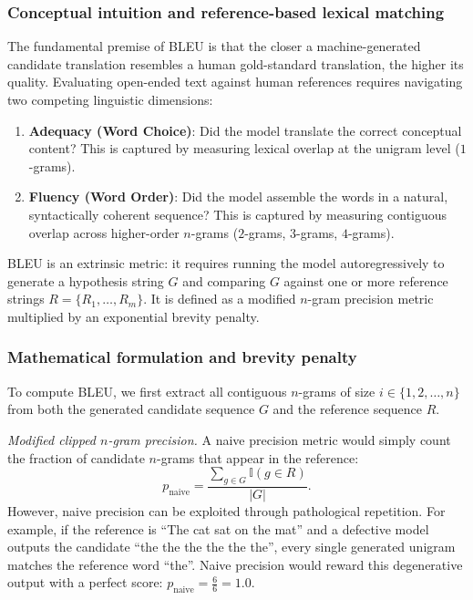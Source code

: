 \documentclass[../../main.tex]{subfiles}
\begin{document}
\subsubsection{Conceptual intuition and reference-based lexical matching}
The fundamental premise of BLEU is that the closer a machine-generated candidate translation resembles a human gold-standard translation, the higher its quality. Evaluating open-ended text against human references requires navigating two competing linguistic dimensions:
\begin{enumerate}
    \item \textbf{Adequacy (Word Choice)}: Did the model translate the correct conceptual content? This is captured by measuring lexical overlap at the unigram level ($1$-grams).
    \item \textbf{Fluency (Word Order)}: Did the model assemble the words in a natural, syntactically coherent sequence? This is captured by measuring contiguous overlap across higher-order $n$-grams ($2$-grams, $3$-grams, $4$-grams).
\end{enumerate}

BLEU is an extrinsic metric: it requires running the model autoregressively to generate a hypothesis string $G$ and comparing $G$ against one or more reference strings $R = \{R_1, \dots, R_m\}$. It is defined as a modified $n$-gram precision metric multiplied by an exponential brevity penalty.

\subsubsection{Mathematical formulation and brevity penalty}
To compute BLEU, we first extract all contiguous $n$-grams of size $i \in \{1, 2, \dots, n\}$ from both the generated candidate sequence $G$ and the reference sequence $R$.

\textit{Modified clipped $n$-gram precision.} A naive precision metric would simply count the fraction of candidate $n$-grams that appear in the reference:
\begin{equation*}
p_{\text{naive}} = \frac{\sum_{g \in G} \mathbb{I}(g \in R)}{|G|}.
\end{equation*}
However, naive precision can be exploited through pathological repetition. For example, if the reference is ``The cat sat on the mat'' and a defective model outputs the candidate ``the the the the the the'', every single generated unigram matches the reference word ``the''. Naive precision would reward this degenerative output with a perfect score: $p_{\text{naive}} = \frac{6}{6} = 1.0$.
\end{document}

